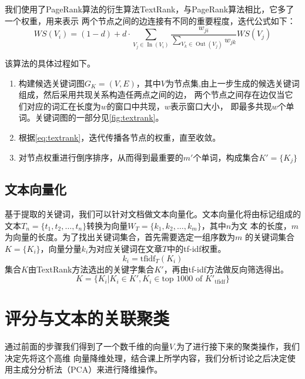我们使用了PageRank算法的衍生算法TextRank，与PageRank算法相比，它多了一个权重，用来表示
两个节点之间的边连接有不同的重要程度，迭代公式如下：
\begin{equation}\label{eq:textrank}
    W S\left(V_{i}\right)=(1-d)+d \cdot \sum_{V_{j} \in
    \operatorname{In}\left(V_{i}\right)} \frac{w_{j i}}{\sum_{V_{k} \in
\operatorname{Out}\left(V_{j}\right)} w_{j k}} W S\left(V_{j}\right)
\end{equation}

该算法的具体过程如下。
\begin{enumerate}
    \item 构建候选关键词图$G_K = (V,E)$，其中$V$为节点集,由上一步生成的候选关键词组成，然后采用共现关系构造任两点之间的边，
    两个节点之间存在边仅当它们对应的词汇在长度为$w$的窗口中共现，$w$表示窗口大小，
    即最多共现$w$个单词。关键词图的一部分见\autoref{fig:textrank}。
    \item 根据\autoref{eq:textrank}，迭代传播各节点的权重，直至收敛。
    \item 对节点权重进行倒序排序，从而得到最重要的$m'$个单词，构成集合$K'=\{K_j\}$
\end{enumerate}






\subsection{文本向量化}

基于提取的关键词，我们可以针对文档做文本向量化。文本向量化将由标记组成的
文本$T_n=\{t_1,t_2,\ldots,t_n\}$转换为向量$W_T=\{k_1,k_2,\ldots,k_m\}$，其中$n$为文
本的长度，$m$为向量的长度。为了找出关键词集合，首先需要选定一组序数为$m$
的关键词集合$K=\{K_i\}$，向量分量$k_i$为对应关键词在文章$T$中的tf-idf权重。
\begin{equation}
    k_i = \textrm{tfidf}_T(K_i)
\end{equation}
集合$K$由TextRank方法选出的关键字集合$K'$，再由tf-idf方法做反向筛选得出。
\begin{equation}
    K = \{K_i | K_i \in K', K_i \in \textrm{top 1000 of }K'_{\textrm{tfidf}} \}
\end{equation}

\section{评分与文本的关联聚类}
通过前面的步骤我们得到了一个数千维的向量$V$,为了进行接下来的聚类操作，我们决定先将这个高维
向量降维处理，结合课上所学内容，我们分析讨论之后决定使用主成分分析法（PCA）来进行降维操作。

